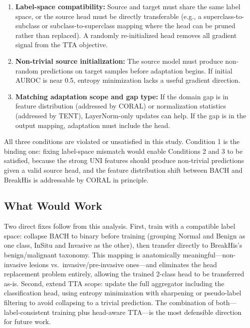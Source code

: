 \documentclass[conference]{IEEEtran}
\begin{document}
\begin{enumerate}
    \item \textbf{Label-space compatibility:} Source and target must share the same label space, or the source head must be directly transferable (e.g., a superclass-to-subclass or subclass-to-superclass mapping where the head can be pruned rather than replaced). A randomly re-initialized head removes all gradient signal from the TTA objective.

    \item \textbf{Non-trivial source initialization:} The source model must produce non-random predictions on target samples before adaptation begins. If initial AUROC is near 0.5, entropy minimization lacks a useful gradient direction.

    \item \textbf{Matching adaptation scope and gap type:} If the domain gap is in feature distribution (addressed by CORAL) or normalization statistics (addressed by TENT), LayerNorm-only updates can help. If the gap is in the output mapping, adaptation must include the head.
\end{enumerate}

All three conditions are violated or unsatisfied in this study. Condition 1 is the binding one: fixing label-space mismatch would enable Conditions 2 and 3 to be satisfied, because the strong UNI features should produce non-trivial predictions given a valid source head, and the feature distribution shift between BACH and BreakHis is addressable by CORAL in principle.

\subsection{What Would Work}

Two direct fixes follow from this analysis. First, train with a compatible label space: collapse BACH to binary before training (grouping Normal and Benign as one class, InSitu and Invasive as the other), then transfer directly to BreakHis's benign/malignant taxonomy. This mapping is anatomically meaningful---non-invasive lesions vs.\ invasive/pre-invasive ones---and eliminates the head replacement problem entirely, allowing the trained 2-class head to be transferred as-is. Second, extend TTA scope: update the full aggregator including the classification head, using entropy minimization with sharpening \cite{niu2023towards} or pseudo-label filtering to avoid collapsing to a trivial prediction. The combination of both---label-consistent training plus head-aware TTA---is the most defensible direction for future work.
\end{document}
